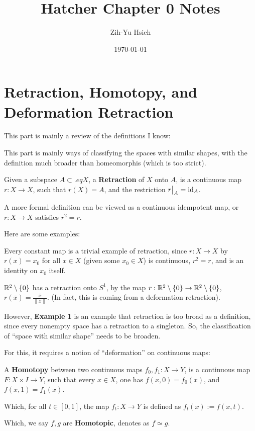 \documentclass{article}
\title{Hatcher Chapter 0 Notes}
\author{Zih-Yu Hsieh}
\date{\today}
\begin{document}
\maketitle

\tableofcontents

\section{Retraction, Homotopy, and Deformation Retraction}

This part is mainly a review of the definitions I know:

This part is mainly ways of classifying the spaces with similar shapes, with the definition much broader than homeomorphis (which is too strict).

\begin{defn}[Retraction]
    Given a subspace $A \subset.eq X$, a \textbf{Retraction} of $X$ onto $A$, is a continuous map $r:X \rightarrow X$, such that $r(X)=A$, and the restriction $r\big|_{A} = \mathrm{id}_{A}$.

    \hfil

    A more formal definition can be viewed as a continuous idempotent map, or  $r:X\rightarrow X$ satisfies $r^2=r$.
\end{defn}

Here are some examples:
\begin{exm}
    Every constant map is a trivial example of retraction, since $r:X\rightarrow X$ by $r(x)=x_0$ for all $x\in X$ (given some $x_0\in X$) is continuous, $r^2=r$, and is an identity on $x_0$ itself.
\end{exm}

\begin{exm}
    $\mathbb{R}^2\setminus\{0\}$ has a retraction onto $S^1$, by the map $r:\mathbb{R}^2\setminus\{0\}\rightarrow\mathbb{R}^2\setminus\{0\}$, $r(\bar{x}) = \frac{\bar{x}}{\|\bar{x}\|}$. (In fact, this is coming from a deformation retraction).
\end{exm}

However, \textbf{Example 1} is an example that retraction is too broad as a definition, since every nonempty space has a retraction to a singleton. So, the classification of ``space with similar shape'' needs to be broaden.

For this, it requires a notion of ``deformation'' on continuous maps:
\begin{defn}[Homotopy]
    A \textbf{Homotopy} between two continuous maps $f_0,f_1:X\rightarrow Y$, is a continuous map $F:X \times I\rightarrow Y$, such that every $x\in X$, one has $f(x,0) = f_0(x)$, and $f(x,1) = f_1(x)$.

    Which, for all $t\in[0,1]$, the map $f_t:X\rightarrow Y$ is defined as $f_t(x):= f(x,t)$.

    Which, we say $f,g$ are \textbf{Homotopic}, denotes as $f\simeq g$.
\end{defn}
\end{document}
